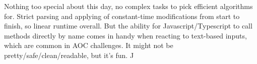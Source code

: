 Nothing too special about this day, no complex tasks to pick efficient algorithms for. Strict parsing and applying of constant-time modifications from start to finish, so linear runtime overall. But the ability for Javascript/Typescript to call methods directly by name comes in handy when reacting to text-based inputs, which are common in AOC challenges. It might not be pretty/safe/clean/readable, but it's fun. ^^